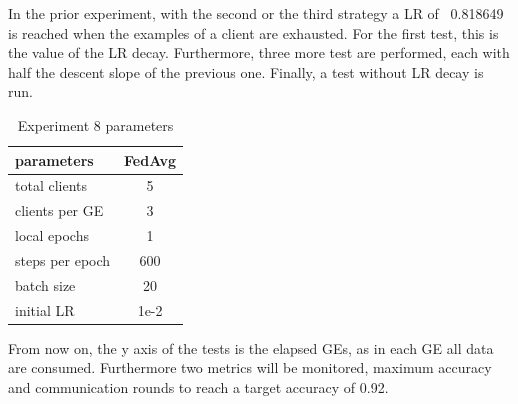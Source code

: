 \medskip
In the prior experiment, with the second or the third strategy a LR of ~0.818649 is reached when the examples of a client are exhausted. For the first test, this is the value of the LR decay. Furthermore, three more test are performed, each with half the descent slope of the previous one. Finally, a test without LR decay is run.
\begin{table}
\center
    \begin{tabular}
        {
            | l | c |
        }
        \hline
        parameters & FedAvg\\\hline
        total clients   & 5\\\hline
        clients per GE  & 3\\\hline
        local epochs    & 1\\\hline
        steps per epoch & 600\\\hline
        batch size      & 20\\\hline
        initial LR      &  1e-2\\\hline
    \end{tabular}
    \caption{Experiment 8 parameters}
\end{table}

\medskip
From now on, the y axis of the tests is the elapsed GEs, as in each GE all data are consumed. Furthermore two metrics will be monitored, maximum accuracy and communication rounds to reach a target accuracy of 0.92.
\medskip
    
